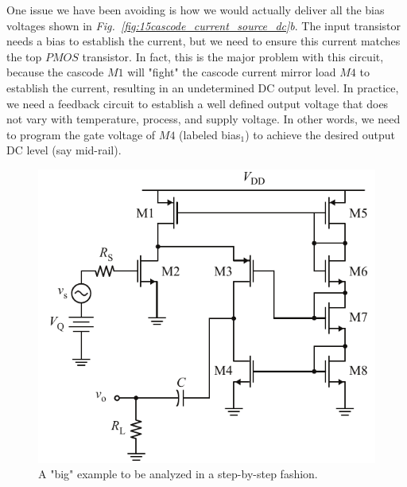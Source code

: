 One issue we have been avoiding is how we would actually deliver all the bias voltages shown in \emph{Fig.~\ref{fig:15cascode_current_source_dc}b}.  The input transistor needs a bias to establish the current, but we need to ensure this current matches the top $PMOS$ transistor.  In fact, this is the major problem with this circuit, because the cascode $M1$ will "fight" the cascode current mirror load $M4$ to establish the current, resulting in an undetermined DC output level.  In practice, we need a feedback circuit to establish a well defined output voltage that does not vary with temperature, process, and supply voltage.  In other words, we need to program the gate voltage of $M4$ (labeled bias$_1$) to achieve the desired output DC level (say mid-rail).
\newpage
\begin{figure}[t]
\centering
\includegraphics[scale=0.85]{16cascode_folded}
\caption{A "big" example to be analyzed in a step-by-step fashion.}
\label{fig:16cascode_folded}
\end{figure}
